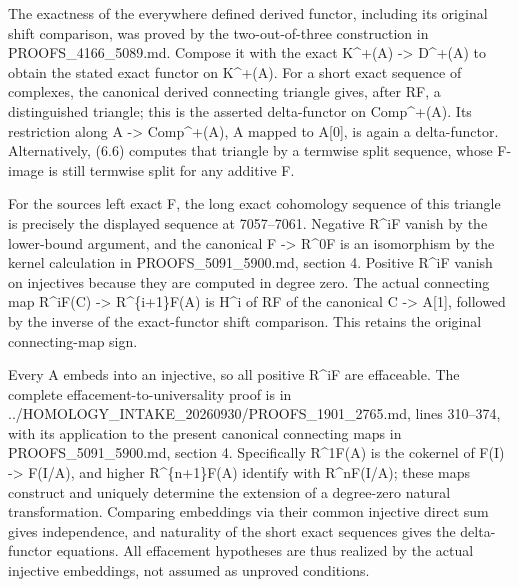 \documentclass[11pt]{article}
\begin{document}
The exactness of the everywhere defined derived functor,\allowbreak{} including its original shift comparison,\allowbreak{} was proved by the two-out-of-three construction in PROOFS\_\allowbreak{}4166\_\allowbreak{}5089.md. Compose it with the exact K\textasciicircum{}\allowbreak{}+(A)\allowbreak{} \allowbreak{}-> D\textasciicircum{}\allowbreak{}+(A)\allowbreak{} to obtain the stated exact functor on K\textasciicircum{}\allowbreak{}+(A)\allowbreak{}. For a short exact sequence of complexes,\allowbreak{} the canonical derived connecting triangle gives,\allowbreak{} after RF,\allowbreak{} a distinguished triangle; this is the asserted delta-functor on Comp\textasciicircum{}\allowbreak{}+(A)\allowbreak{}. Its restriction along A \allowbreak{}-> Comp\textasciicircum{}\allowbreak{}+(A)\allowbreak{},\allowbreak{} A mapped to A[0]\allowbreak{},\allowbreak{} is again a delta-functor. Alternatively,\allowbreak{} (6.6)\allowbreak{} computes that triangle by a termwise split sequence,\allowbreak{} whose F-image is still termwise split for any additive F.

For the source\textquotesingle s left exact F,\allowbreak{} the long exact cohomology sequence of this triangle is precisely the displayed sequence at 7057–\allowbreak{}7061. Negative R\^{}iF vanish by the lower-bound argument,\allowbreak{} and the canonical F \allowbreak{}-> R\^{}0F is an isomorphism by the kernel calculation in PROOFS\_\allowbreak{}5091\_\allowbreak{}5900.md,\allowbreak{} section 4. Positive R\^{}iF vanish on injectives because they are computed in degree zero. The actual connecting map R\textasciicircum{}iF(C)\allowbreak{} \allowbreak{}-> R\textasciicircum{}\{i\allowbreak{}+1\}F(A)\allowbreak{} is H\^{}i of RF of the canonical C \allowbreak{}-> A[1]\allowbreak{},\allowbreak{} followed by the inverse of the exact-functor shift comparison. This retains the original connecting-map sign.

Every A embeds into an injective,\allowbreak{} so all positive R\^{}iF are effaceable. The complete effacement-to-universality proof is in ../\allowbreak{}HOMOLOGY\_\allowbreak{}INTAKE\_\allowbreak{}20260930/\allowbreak{}PROOFS\_\allowbreak{}1901\_\allowbreak{}2765.md,\allowbreak{} lines 310–\allowbreak{}374,\allowbreak{} with its application to the present canonical connecting maps in PROOFS\_\allowbreak{}5091\_\allowbreak{}5900.md,\allowbreak{} section 4. Specifically R\textasciicircum{}1F(A)\allowbreak{} is the cokernel of F(I)\allowbreak{} \allowbreak{}-> F(I/\allowbreak{}A)\allowbreak{},\allowbreak{} and higher R\textasciicircum{}\{n\allowbreak{}+1\}F(A)\allowbreak{} identify with R\textasciicircum{}nF(I/\allowbreak{}A)\allowbreak{}; these maps construct and uniquely determine the extension of a degree-zero natural transformation. Comparing embeddings via their common injective direct sum gives independence,\allowbreak{} and naturality of the short exact sequences gives the delta-functor equations. All effacement hypotheses are thus realized by the actual injective embeddings,\allowbreak{} not assumed as unproved conditions.
\end{document}
